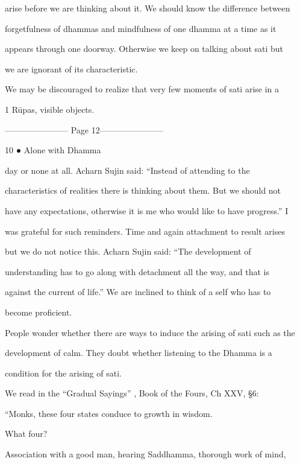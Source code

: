 arise before we are thinking about it. We should know the difference between  

forgetfulness  of  dhammas  and  mindfulness  of  one  dhamma  at  a  time  as  it  

appears through  one  doorway.  Otherwise we keep  on talking  about  sati but  

we are ignorant of its characteristic. 

   We may be discouraged to realize that very few moments of sati arise in a  



1   Rūpas, visible objects. 


----------------------- Page 12-----------------------

10 ● Alone with Dhamma 



day   or   none   at   all.   Acharn   Sujin   said:   “Instead   of   attending   to   the  

characteristics  of  realities  there  is  thinking  about  them.  But  we   should  not  

have any expectations, otherwise it is me who would like to have progress.” I  

was  grateful  for  such  reminders. Time  and  again  attachment to  result  arises  

but   we   do   not   notice   this.   Acharn   Sujin   said:   “The   development   of  

understanding   has   to   go  along   with   detachment   all   the   way,   and   that   is  

against  the  current  of  life.”  We   are  inclined  to  think  of  a  self  who   has  to  

become proficient. 



People wonder whether there are ways to induce the arising of sati such as the  

development   of   calm.   They   doubt   whether   listening   to   the   Dhamma   is   a  

condition for the arising of sati. 

   We read in the “Gradual Sayings” , Book of the Fours, Ch XXV, §6: 



      “Monks, these four states conduce to growth in wisdom. 

         What four? 

        Association with a good man, hearing Saddhamma, thorough work of mind,  

